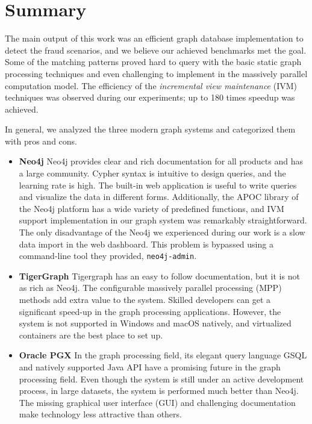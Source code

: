\chapter{Summary}

The main output of this work was an efficient graph database implementation to detect the fraud scenarios, and we believe our achieved benchmarks met the goal.
Some of the matching patterns proved hard to query with the basic static graph processing techniques and even challenging to implement in the massively parallel computation model.
The efficiency of the \emph{incremental view maintenance} (IVM) techniques was observed during our experiments; up to 180 times speedup was achieved.

In general, we analyzed the three modern graph systems and categorized them with pros and cons. 

\begin{itemize}
  \item \textbf{Neo4j}
 Neo4j provides clear and rich documentation for all products and has a large community.
  Cypher syntax is intuitive to design queries, and the learning rate is high.
  The built-in web application is useful to write queries and visualize the data in different forms.
  Additionally, the APOC library of the Neo4j platform has a wide variety of predefined functions, and IVM support implementation in our graph system was remarkably straightforward.  
  The only disadvantage of the Neo4j we experienced during our work is a slow data import in the web dashboard.
  This problem is bypassed using a command-line tool they provided, \texttt{neo4j-admin}.
  \item \textbf{TigerGraph}
 Tigergraph has an easy to follow documentation, but it is not as rich as Neo4j.
  The configurable massively parallel processing (MPP) methods add extra value to the system.
  Skilled developers can get a significant speed-up in the graph processing applications.
  However, the system is not supported in Windows and macOS natively, and virtualized containers are the best place to set up.
  \item \textbf{Oracle PGX}
  In the graph processing field, its elegant query language GSQL and natively supported Java API have a promising future in the graph processing field.
  Even though the system is still under an active development process, in large datasets, the system is performed much better than Neo4j.
  The missing graphical user interface (GUI) and challenging documentation make technology less attractive than others.
\end{itemize}


